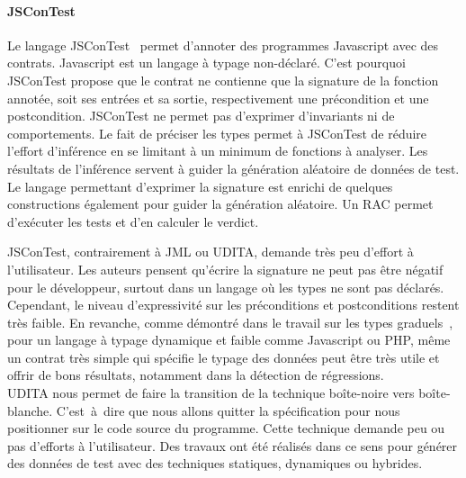 \paragraph{JSConTest} Le langage JSConTest~ permet d'annoter
des programmes Javascript avec des contrats. Javascript est un langage à typage
non-déclaré. C'est pourquoi JSConTest propose que le contrat ne contienne que
la signature de la fonction annotée, soit ses entrées et sa sortie,
respectivement une précondition et une postcondition. JSConTest ne permet pas
d'exprimer d'invariants ni de comportements. Le fait de préciser les types
permet à JSConTest de réduire l'effort d'inférence en se limitant à un minimum
de fonctions à analyser. Les résultats de l'inférence servent à guider la
génération aléatoire de données de test. Le langage permettant d'exprimer la
signature est enrichi de quelques constructions également pour guider la
génération aléatoire. Un RAC permet d'exécuter les tests et d'en calculer le
verdict.

JSConTest, contrairement à JML ou UDITA, demande très peu d'effort à
l'utilisateur. Les auteurs pensent qu'écrire la signature ne peut pas être
négatif pour le développeur, surtout dans un langage où les types ne sont pas
déclarés. Cependant, le niveau d'expressivité sur les préconditions et
postconditions restent très faible. En revanche, comme démontré dans le travail
sur les types graduels~, pour un langage à typage dynamique et
faible comme Javascript ou PHP, même un contrat très simple qui spécifie le
typage des données peut être très utile et offrir de bons résultats, notamment
dans la détection de régressions. \\

UDITA nous permet de faire la transition de la technique boîte-noire vers
boîte-blanche. C'est~à~dire que nous allons quitter la spécification pour nous
positionner sur le code source du programme. Cette technique demande peu ou pas
d'efforts à l'utilisateur. Des travaux ont été réalisés dans ce sens pour
générer des données de test avec des techniques statiques, dynamiques ou
hybrides.

